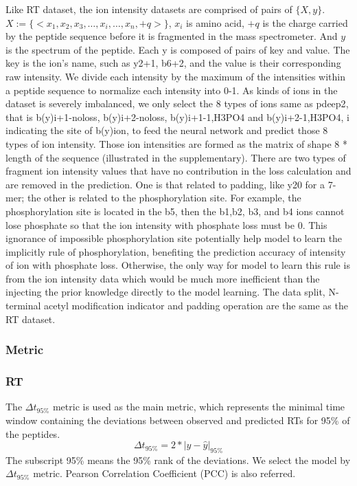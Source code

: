 Like RT dataset, the ion intensity datasets are comprised of pairs of
\( \{X, y\} \). $X := \{ <x_1, x_2, x_3,\dots, x_i, \dots, x_n, +q> \}$, $x_i$ is amino acid, $+q$
is the charge carried by the
peptide sequence before it is fragmented in the mass spectrometer. And \( y \) is the spectrum of the peptide. Each y is composed of pairs of key and value.
The key is the ion's name, such as y2+1, b6+2, and the value is their corresponding raw intensity.
We divide each intensity by the maximum of the intensities within a peptide sequence to normalize each intensity into 0-1. As kinds of ions in the dataset is severely imbalanced, we only select the 8 types of ions same as pdeep2\cite{zeng2019ms}, that is
b(y)i+1-noloss, b(y)i+2-noloss, b(y)i+1-1,H3PO4 and b(y)i+2-1,H3PO4, i indicating the site of b(y)ion,
to feed the neural network and predict those 8 types of ion intensity. Those ion intensities are formed as the matrix of shape 8 * length of the sequence (illustrated in the supplementary).
There are two types of fragment ion intensity values that have no contribution in the loss calculation and are removed in the prediction. One is that related to padding, like y20 for a 7-mer; the other is related to the phosphorylation site. For example, the phosphorylation site is located in the b5, then the b1,b2, b3, and b4 ions cannot lose phosphate so that the ion intensity with phosphate loss must be 0. This ignorance of impossible phosphorylation site potentially help model to learn the implicitly rule of phosphorylation, benefiting the prediction accuracy of intensity of ion with phosphate loss. Otherwise, the only way for model to learn this rule is from the ion intensity data which would be much more inefficient than the injecting the prior knowledge directly to the model learning.
The data split, N-terminal acetyl modification indicator and padding operation are the same as the RT dataset.


\subsubsection*{Metric}
\subsubsection*{RT}
The $\Delta$$t_{95\%}$ metric is used as the main metric, which represents
the minimal time window containing the deviations between observed and predicted RTs for 95\% of
the peptides.
\[ \Delta t_{95\%} = 2 * | y - \hat{y} |_{95\%} \]
The subscript 95\% means the 95\% rank of the deviations.
We select the model by $\Delta$$t_{95\%}$ metric.
Pearson Correlation Coefficient (PCC) is also referred.
